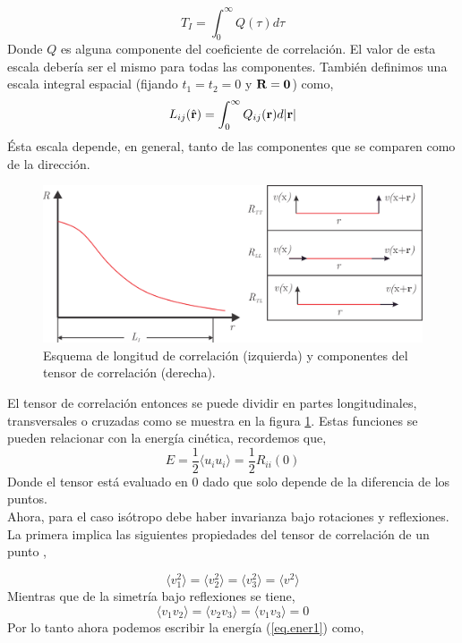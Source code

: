 \documentclass[executivepaper,12pt]{article}
\numberwithin{equation}{section}
\providecommand{\abs}[1]{\lvert#1\rvert}
\begin{document}
\begin{equation*}
	T_I=\int_0^\infty Q(\tau)d\tau
\end{equation*} 
Donde $Q$ es alguna componente del coeficiente de correlación. El valor de esta escala debería ser el mismo para todas las componentes. También definimos una escala integral espacial (fijando $t_1=t_2=0$ y $\vb{R}=\vb{0}$) como,
\begin{equation*}
	L_{ij}(\hat{\vb{r}})=\int_0^\infty Q_{ij}(\vb{r})d\abs{\vb{r}}
\end{equation*} 
Ésta escala depende, en general, tanto de las componentes que se comparen como de la dirección.\\



\begin{figure}[H]
	\begin{center}
		\includegraphics[scale=0.9]{correlationLength}
	\end{center}
	\caption{Esquema de longitud de correlación (izquierda) y componentes del tensor de correlación (derecha).}
	\label{fig-correl}
\end{figure}

El tensor de correlación entonces se puede dividir en partes longitudinales, transversales o cruzadas como se muestra en la figura \ref{fig-correl}. Estas funciones se pueden relacionar con la energía cinética, recordemos que,
\begin{equation}
	E= \frac{1}{2}\langle u_iu_i \rangle = \frac{1}{2}R_{ii}(0)
	\label{eq.ener1}
\end{equation}
Donde el tensor está evaluado en $0$ dado que solo depende de la diferencia de los puntos. \\
Ahora, para el caso isótropo debe haber invarianza bajo rotaciones y reflexiones. La primera implica las siguientes propiedades del tensor de correlación de un punto \parencite{mccomb1990},

\begin{equation*}
	\langle v_1^2\rangle=\langle v_2^2\rangle=\langle v_3^2\rangle=\langle v^2\rangle
\end{equation*} 
Mientras que de la simetría bajo reflexiones se tiene,
\begin{equation*}
	\langle v_1v_2\rangle=\langle v_2v_3\rangle=\langle v_1v_3\rangle=0
\end{equation*}
Por lo tanto ahora podemos escribir la energía (\ref{eq.ener1}) como,
\end{document}
